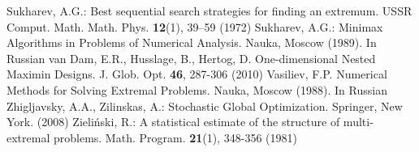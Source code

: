 \begin{thebibliography}{99.}
	Sukharev, A.G.: Best sequential search strategies for finding an extremum. USSR Comput. Math. Math. Phys. \textbf{12}(1), 39–59 (1972)
	Sukharev, A.G.: Minimax Algorithms in Problems of Numerical Analysis. Nauka, Moscow (1989). In Russian
	van Dam, E.R., Husslage, B., Hertog, D. One-dimensional Nested Maximin Designs. J. Glob. Opt. \textbf{46}, 287-306 (2010)
	Vasiliev, F.P. Numerical Methods for Solving Extremal Problems. Nauka, Moscow (1988). In Russian
 Zhigljavsky, A.A., Zilinskas, A.: Stochastic Global Optimization. Springer, New York. (2008)
	Zieli{\'n}ski, R.: A statistical estimate of the structure of multi-extremal problems. Math. Program. \textbf{21}(1), 348-356 (1981)

\end{thebibliography}
%
%
